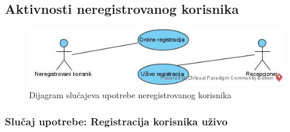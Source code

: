 \documentclass[a4paper]{article}
\begin{document}
\subsection{Aktivnosti neregistrovanog korisnika}
\begin{figure}[!ht]
\begin{center}
\includegraphics[scale=0.55]{sections/images/dijagram_slucajeva_upotrebe_neregistrovanog_korisnika.jpg}
\end{center}
\caption{Dijagram slučajeva upotrebe neregistrovanog korisnika}
\label{fig:kontekst}
\end{figure}

\subsubsection{Slučaj upotrebe: Registracija korisnika uživo}

\end{document}
